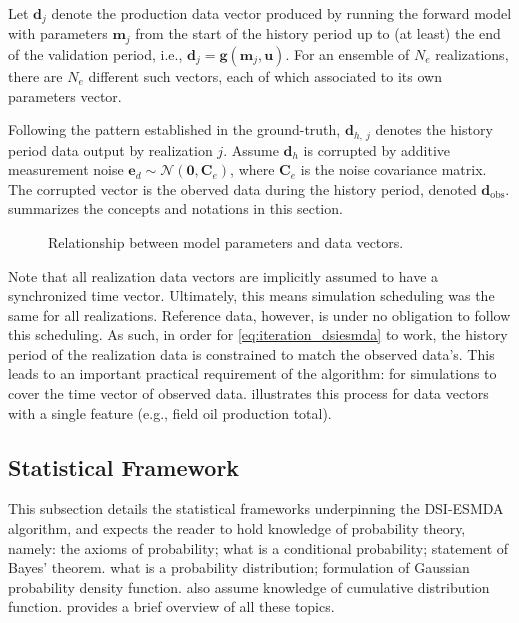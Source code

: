 Let $\mathbf{d}_j$ denote the production data vector produced by 
running the forward model with parameters $\mathbf{m}_j$
from the start of the history period up to (at least) the end of the validation period,
i.e., $\mathbf{d}_j = \mathbf{g}(\mathbf{m}_j, \mathbf{u})$.
For an ensemble of $N_e$ realizations, there are $N_e$ different such vectors, 
each of which associated to its own parameters vector.

Following the pattern established in the ground-truth, 
$\mathbf{d}_{h,\ j}$ denotes the history period data output by realization $j$.
Assume $\mathbf{d}_h$ is corrupted by additive measurement noise $\mathbf{e}_d\sim \mathcal{N}(\mathbf{0}, \mathbf{C}_e)$,
where $\mathbf{C}_e$ is the noise covariance matrix.
The corrupted vector is the oberved data during the history period, denoted $\mathbf{d}_\text{obs}$.
%
 summarizes the concepts and notations in this section.
%
\begin{figure}[htbp]
    \centering
    \caption{%
        Relationship between model parameters and data vectors. 
    }
    \label{fig:data-vectors}
    
\end{figure}

\begin{note}
    Note that all realization data vectors are implicitly assumed to have a synchronized time vector.
    Ultimately, this means simulation scheduling was the same for all realizations. 
    Reference data, however, is under no obligation to follow this scheduling.
    As such, in order for \cref{eq:iteration_dsiesmda} to work,
    the history period of the realization data is constrained to match the observed data's.
    This leads to an important practical requirement of the algorithm:
    for simulations to cover the time vector of observed data.
     illustrates this process 
    for data vectors with a single feature (e.g., field oil production total). 
    \begin{center}
        \label{fig:time-vector-illustration}
        
    \end{center}
\end{note}

\subsection{Statistical Framework}
\label{subsec:statistical-framework}
This subsection details the statistical frameworks underpinning the DSI-ESMDA algorithm,
and expects the reader to hold knowledge of probability theory, namely:
the axioms of probability; 
what is a conditional probability; 
statement of Bayes' theorem.
what is a probability distribution; 
formulation of Gaussian probability density function.
%
 also assume knowledge of cumulative distribution function. 
%
 provides a brief overview of all these topics.

